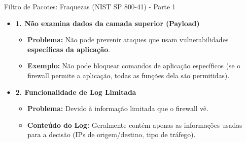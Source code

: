 \begin{frame}{Filtro de Pacotes: Fraquezas (NIST SP 800-41) - Parte 1}
    \begin{itemize}
        \item \textbf{1. Não examina dados da camada superior (Payload)}
              \begin{itemize}
                  \item \textbf{Problema:} Não pode prevenir ataques que usam vulnerabilidades \textbf{específicas da aplicação}.
                  \item \textbf{Exemplo:} Não pode bloquear comandos de aplicação específicos (se o firewall permite a aplicação, todas as funções dela são permitidas).
              \end{itemize}

        \item \textbf{2. Funcionalidade de Log Limitada}
              \begin{itemize}
                  \item \textbf{Problema:} Devido à informação limitada que o firewall vê.
                  \item \textbf{Conteúdo do Log:} Geralmente contém apenas as informações usadas para a decisão (IPs de origem/destino, tipo de tráfego).
              \end{itemize}
    \end{itemize}
\end{frame}

